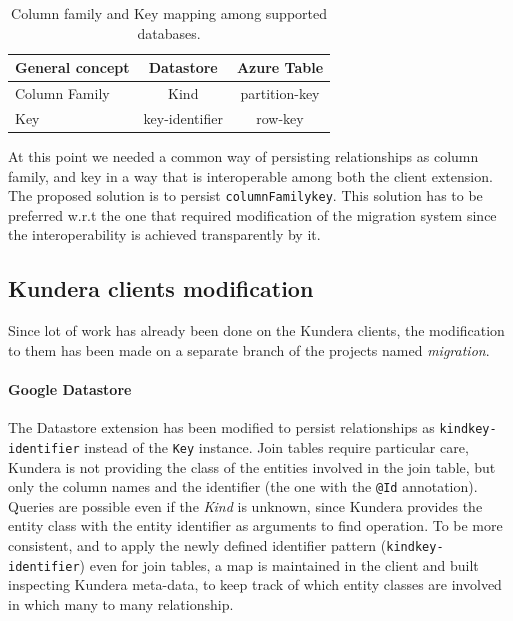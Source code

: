 \begin{table}[h]
\centering
\vspace{1em}
\renewcommand{\arraystretch}{1.4}
\begin{tabular}{lcc}
\hline
\textbf{General concept} & \textbf{Datastore} & \textbf{Azure Table}\\ 
\hline\hline
Column Family & Kind & partition-key \\
\hline
Key & key-identifier & row-key \\
\hline
\end{tabular}
\caption{Column family and Key mapping among supported databases.}
\label{table:mapping}
\end{table}

\noindent At this point we needed a common way of persisting relationships as column family, and key in a way that is interoperable among both the client extension.
The proposed solution is to persist \texttt{columnFamily\textunderscore key}. This solution has to be preferred w.r.t the one that required modification of the migration system since the interoperability is achieved transparently by it.

\subsection{Kundera clients modification}
Since lot of work has already been done on the Kundera clients, the modification to them has been made on a separate branch of the projects named \textit{migration}.

\paragraph{Google Datastore} The Datastore extension has been modified to persist relationships as \texttt{kind\textunderscore key-identifier} instead of the \texttt{Key} instance.
Join tables require particular care, Kundera is not providing the class of the entities involved in the join table, but only the column names and the identifier (the one with the \texttt{@Id} annotation). Queries are possible even if the \textit{Kind} is unknown, since Kundera provides the entity class with the entity identifier as arguments to find operation.
To be more consistent, and to apply the newly defined identifier pattern (\texttt{kind\textunderscore key-identifier}) even for join tables, a map is maintained in the client and built inspecting Kundera meta-data, to keep track of which entity classes are involved in which many to many relationship.


